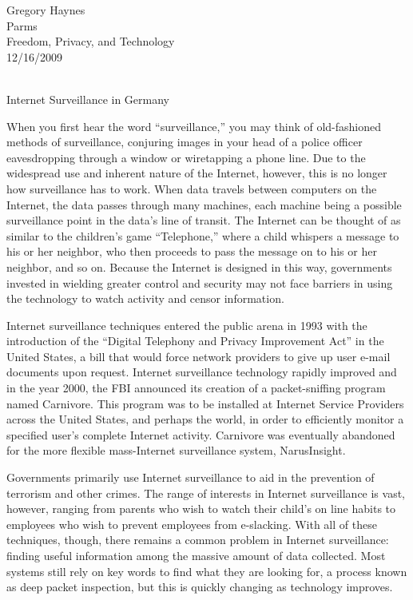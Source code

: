 \documentclass[12pt,letterpaper]{article}
\begin{document}
\begin{flushleft}

Gregory Haynes \\
Parms \\
Freedom, Privacy, and Technology \\
12/16/2009 \\
\\
\begin{center}Internet Surveillance in Germany\end{center}

\setlength{\parindent}{0.5in}

When you first hear the word “surveillance,” you may think of old-fashioned
methods of surveillance, conjuring images in your head of a police officer
eavesdropping through a window or wiretapping a phone line. Due to the
widespread use and inherent nature of the Internet, however, this is no
longer how surveillance has to work. When data travels between computers on
the Internet, the data passes through many machines, each machine being a
possible surveillance point in the data's line of transit. The Internet can
be thought of as similar to the children's game “Telephone,” where a child
whispers a message to his or her neighbor, who then proceeds to pass the
message on to his or her neighbor, and so on. Because the Internet is
designed in this way, governments invested in wielding greater control and
security may not face barriers in using the technology to watch activity and
censor information.

Internet surveillance techniques entered the public arena in 1993 with the
introduction of the “Digital Telephony and Privacy Improvement Act” in the
United States, a bill that would force network providers to give up user
e-mail documents upon request. Internet surveillance technology rapidly
improved and in the year 2000, the FBI announced its creation of a
packet-sniffing program named Carnivore. This program was to be installed at
Internet Service Providers across the United States, and perhaps the world,
in order to efficiently monitor a specified user’s complete Internet
activity. Carnivore was eventually abandoned for the more flexible
mass-Internet surveillance system, NarusInsight.

Governments primarily use Internet surveillance to aid in the prevention of
terrorism and other crimes. The range of interests in Internet surveillance
is vast, however, ranging from parents who wish to watch their child's on
line habits to employees who wish to prevent employees from e-slacking. With
all of these techniques, though, there remains a common problem in Internet
surveillance: finding useful information among the massive amount of data
collected. Most systems still rely on key words to find what they are
looking for, a process known as deep packet inspection, but this is quickly
changing as technology improves.


\end{flushleft}
\end{document}
